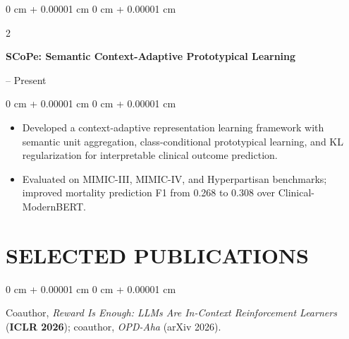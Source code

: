 \documentclass[10pt, letterpaper]{article}
\newenvironment{highlights}{
    \begin{itemize}[
        topsep=0.03 cm,
        parsep=0.03 cm,
        partopsep=0pt,
        itemsep=0pt,
        leftmargin=0 cm + 10pt
    ]
}{
    \end{itemize}
} %
\newenvironment{onecolentry}{
    \begin{adjustwidth}{
        0 cm + 0.00001 cm
    }{
        0 cm + 0.00001 cm
    }
}{
    \end{adjustwidth}
} %
\newenvironment{twocolentry}[2][]{
    \onecolentry
    \def\secondColumn{#2}
    \setcolumnwidth{\fill, 4.5 cm}
    \begin{paracol}{2}
}{
    \switchcolumn \raggedleft \secondColumn
    \end{paracol}
    \endonecolentry
} %
\begin{document}
\begin{twocolentry}{2026 -- Present}
\textbf{SCoPe: Semantic Context-Adaptive Prototypical Learning}
\end{twocolentry}
\begin{onecolentry}
\begin{highlights}
\item Developed a context-adaptive representation learning framework with semantic unit aggregation, class-conditional prototypical learning, and KL regularization for interpretable clinical outcome prediction.
\item Evaluated on MIMIC-III, MIMIC-IV, and Hyperpartisan benchmarks; improved mortality prediction F1 from 0.268 to 0.308 over Clinical-ModernBERT.
\end{highlights}
\end{onecolentry}
\vspace{0.06 cm}
\section{SELECTED PUBLICATIONS}
\begin{onecolentry}
Coauthor, \textit{Reward Is Enough: LLMs Are In-Context Reinforcement Learners} (\textbf{ICLR 2026}); coauthor, \textit{OPD-Aha} (arXiv 2026).
\end{onecolentry}
\end{document}
